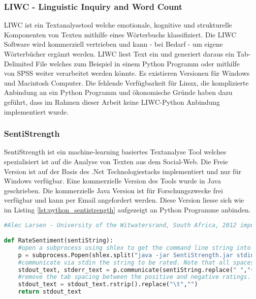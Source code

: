 \subsubsection{LIWC - Linguistic Inquiry and Word Count}
LIWC ist ein Textanalysetool welche emotionale, kognitive und strukturelle Komponenten von Texten mithilfe eines Wörterbuchs klassifiziert. Die LIWC Software wird kommerziell vertrieben und kann - bei Bedarf - um eigene Wörterbücher ergänzt werden. LIWC liest Text ein und generiert daraus ein Tab-Delimited File welches zum Beispiel in einem Python Programm oder mithilfe von SPSS weiter verarbeitet werden könnte. Es existieren Versionen für Windows und Macintosh Computer. \cite{comparing}\cite{liwcfaq} Die fehlende Verfügbarkeit für Linux, die komplizierte Anbindung an ein Python Programm und ökonomische Gründe haben dazu geführt, dass im Rahmen dieser Arbeit keine LIWC-Python Anbindung implementiert wurde.

\subsubsection{SentiStrength}
SentiStrength ist ein machine-learning basiertes Textanalyse Tool welches spezialisiert ist auf die Analyse von Texten aus dem Social-Web. Die Freie Version ist auf der Basis des .Net Technologiestacks implementiert und nur für Windows verfügbar. Eine kommerzielle Version des Tools wurde in Java geschrieben. Die kommerzielle Java Version ist für Forschungszwecke frei verfügbar und kann per Email angefordert werden. Diese Version liesse sich wie im Listing \ref{lst:python_sentistrength} aufgezeigt an Python Programme anbinden. \cite{sentistrength}\cite{comparing}

\begin{lstlisting}[language=Python, caption={Python Anbindung an SentiStrength (JAVA)}, label={lst:python_sentistrength}]
#Alec Larsen - University of the Witwatersrand, South Africa, 2012 import shlex, subprocess

def RateSentiment(sentiString):
    #open a subprocess using shlex to get the command line string into the correct args list format
    p = subprocess.Popen(shlex.split("java -jar SentiStrength.jar stdin sentidata C:/SentStrength_Data/"),stdin=subprocess.PIPE,stdout=subprocess.PIPE,stderr=subprocess.PIPE)
    #communicate via stdin the string to be rated. Note that all spaces are replaced with +
    stdout_text, stderr_text = p.communicate(sentiString.replace(" ","+"))
    #remove the tab spacing between the positive and negative ratings. e.g. 1-5 -> 1-5
    stdout_text = stdout_text.rstrip().replace("\t","")
    return stdout_text
\end{lstlisting}

